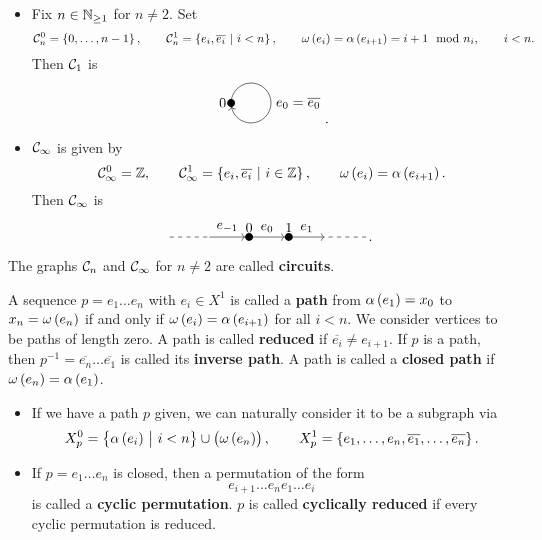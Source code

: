 \begin{example}
\hfill
\begin{itemize}
\item Fix $ n \in \mathbb{N}_{\ge 1} $ for $ n \ne 2 $. Set
$$ \CCC_n^0 = \cbr{0, \dots, n - 1}, \qquad \CCC_n^1 = \cbr{e_i, \overline{e_i} \st i < n}, \qquad \omega\br{e_i} = \alpha\br{e_{i + 1}} = i + 1 \mod n_i, \qquad i < n. $$
Then $ \mathcal{C}_1 $ is
$$
\begin{tikzpicture}
\fill (0, 0) circle (0.1) node[left]{$ 0 $};
\draw [->] (0, 0) arc (180:-170:0.5);
\draw (1, 0) node[right]{$ e_0 = \overline{e_0} $};
\end{tikzpicture}.
$$
\item $ \mathcal{C}_\infty $ is given by
$$ \CCC_\infty^0 = \ZZ, \qquad \CCC_\infty^1 = \cbr{e_i, \overline{e_i} \st i \in \ZZ}, \qquad \omega\br{e_i} = \alpha\br{e_{i + 1}}. $$
Then $ \mathcal{C}_\infty $ is
$$
\begin{tikzpicture}
\fill (0, 0) circle (0.1) node[above]{$ 0 $};
\fill (1, 0) circle (0.1) node[above]{$ 1 $};
\draw [dashed] (-2, 0) to (-1, 0);
\draw [->] (-1, 0) to node[above]{$ e_{-1} $} (-0.1, 0);
\draw [->] (0, 0) to node[above]{$ e_0 $} (0.9, 0);
\draw [->] (1, 0) to node[above]{$ e_1 $} (1.9, 0);
\draw [dashed] (2, 0) -- (3, 0);
\end{tikzpicture}.
$$
\end{itemize}
The graphs $ \mathcal{C}_n $ and $ \mathcal{C}_\infty $ for $ n \ne 2 $ are called \textbf{circuits}.
\end{example}


A sequence $ p = e_1 \dots e_n $ with $ e_i \in X^1 $ is called a \textbf{path} from $ \alpha\br{e_1} = x_0 $ to $ x_n = \omega\br{e_n} $ if and only if $ \omega\br{e_i} = \alpha\br{e_{i + 1}} $ for all $ i < n $. We consider vertices to be paths of length zero. A path is called \textbf{reduced} if $ \overline{e_i} \ne e_{i + 1} $. If $ p $ is a path, then $ p^{-1} = \overline{e_n} \dots \overline{e_1} $ is called its \textbf{inverse path}. A path is called a \textbf{closed path} if $ \omega\br{e_n} = \alpha\br{e_1} $.

\begin{note*}
\hfill
\begin{itemize}
\item If we have a path $ p $ given, we can naturally consider it to be a subgraph via
$$ X_p^0 = \cbr{\alpha\br{e_i} \st i < n} \cup \br{\omega\br{e_n}}, \qquad X_p^1 = \cbr{e_1, \dots, e_n, \overline{e_1}, \dots, \overline{e_n}}. $$
\item If $ p = e_1 \dots e_n $ is closed, then a permutation of the form
$$ e_{i + 1} \dots e_ne_1 \dots e_i $$
is called a \textbf{cyclic permutation}. $ p $ is called \textbf{cyclically reduced} if every cyclic permutation is reduced.
\end{itemize}
\end{note*}

